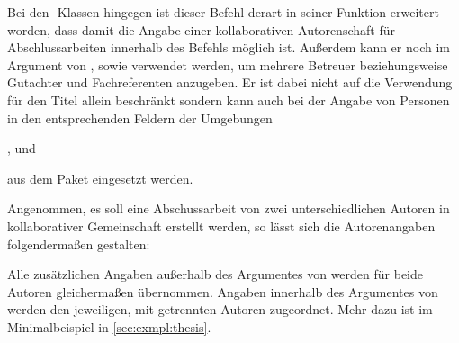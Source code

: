 \begin{Declaration*}{}
\begin{Declaration*}{}
\begin{Declaration*}{}
\begin{Declaration}{}
Bei den \TUDScript-Klassen hingegen ist dieser Befehl derart in seiner Funktion 
erweitert worden, dass damit die Angabe einer kollaborativen Autorenschaft für 
Abschlussarbeiten innerhalb des Befehls  möglich ist. Außerdem 
kann er noch im Argument von ,  sowie 
 verwendet werden, um mehrere Betreuer beziehungsweise Gutachter 
und Fachreferenten anzugeben. Er ist dabei nicht auf die Verwendung für den 
Titel allein beschränkt sondern kann auch bei der Angabe von Personen in den 
entsprechenden Feldern der Umgebungen
\begin{Bundle}{}
,  und 
\end{Bundle}
aus dem Paket  eingesetzt werden.
\end{Declaration}
%
\begin{Example}
Angenommen, es soll eine Abschussarbeit von zwei unterschiedlichen Autoren in 
kollaborativer Gemeinschaft erstellt werden, so lässt sich die Autorenangaben 
folgendermaßen gestalten:
\begin{Code}
\author{%
  Mickey Mouse%
\and%
  Donald Duck%
}
\end{Code}
Alle zusätzlichen Angaben außerhalb des Argumentes von  werden 
für beide Autoren gleichermaßen übernommen. Angaben innerhalb des Argumentes 
von  werden den jeweiligen, mit  getrennten Autoren 
zugeordnet. Mehr dazu ist im Minimalbeispiel in \autoref{sec:exmpl:thesis}.
\end{Example}


\end{Declaration*}
\end{Declaration*}
\end{Declaration*}
